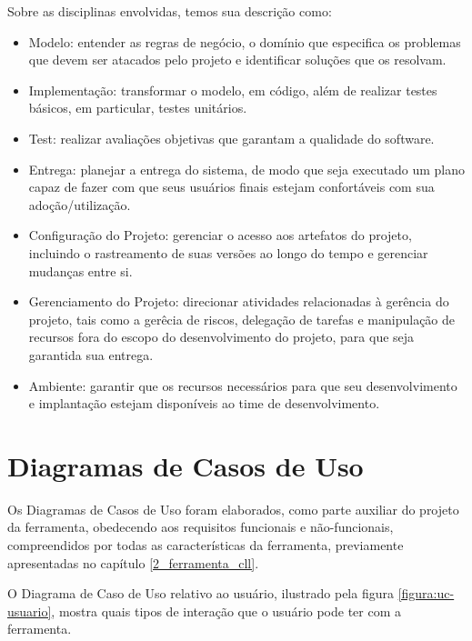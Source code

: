 Sobre as disciplinas envolvidas, temos sua descrição como:
\begin{itemize}
    \item Modelo: entender as regras de negócio, o domínio que especifica os problemas que devem ser atacados pelo projeto e identificar soluções que os resolvam.

    \item Implementação: transformar o modelo, em código, além de realizar testes básicos, em particular, testes unitários.

    \item Test: realizar avaliações objetivas que garantam a qualidade do software.

    \item Entrega: planejar a entrega do sistema, de modo que seja executado um plano capaz de fazer com que seus usuários finais estejam confortáveis com sua adoção/utilização.

    \item Configuração do Projeto: gerenciar o acesso aos artefatos do projeto, incluindo o rastreamento de suas versões ao longo do tempo e gerenciar mudanças entre si.

    \item Gerenciamento do Projeto: direcionar atividades relacionadas à gerência do projeto, tais como a gerêcia de riscos, delegação de tarefas e manipulação de recursos fora do escopo do desenvolvimento do projeto, para que seja garantida sua entrega.

    \item Ambiente: garantir que os recursos necessários para que seu desenvolvimento e implantação estejam disponíveis ao time de desenvolvimento.
\end{itemize}

\clearpage
\section{Diagramas de Casos de Uso}

Os Diagramas de Casos de Uso foram elaborados, como parte auxiliar do projeto da ferramenta, obedecendo aos requisitos funcionais e não-funcionais, compreendidos por todas as características da ferramenta, previamente apresentadas no capítulo \ref{2_ferramenta_cll}.

O Diagrama de Caso de Uso relativo ao usuário, ilustrado pela figura \ref{figura:uc-usuario}, mostra quais tipos de interação que o usuário pode ter com a ferramenta.

